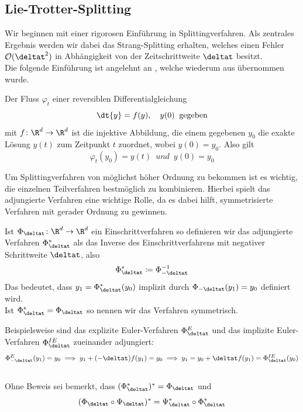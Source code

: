 \subsection{Lie-Trotter-Splitting}
\label{seclietrotter}
Wir beginnen mit einer rigorosen Einführung in Splittingverfahren. Als zentrales Ergebnis werden wir dabei das Strang-Splitting erhalten, welches einen Fehler $\mathcal{O}(\deltat^2)$ in Abhängigkeit von der Zeitschrittweite $\deltat$ besitzt.\\
Die folgende Einführung ist angelehnt an \autocite{patrickdiplom}, welche wiederum aus \autocite[Kapitel II.3 bis II.5]{HairerLubichWanner} übernommen wurde.
\begin{mathdef}
Der Fluss $\varphi_t$ einer reversiblen Differentialgleichung
\begin{equation}
\label{orddgl}
\dt{y}=f(y),\quad y(0)\:\text{ gegeben}
\end{equation}
mit $f\colon \R^d\to\R^d$ ist die injektive Abbildung, die einem gegebenen $y_0$ die exakte Lösung $y(t)$ zum Zeitpunkt $t$ zuordnet, wobei $y(0)=y_0$. Also gilt
\begin{equation*}
\varphi_t(y_0)=y(t)\enspace und\enspace y(0)=y_0
\end{equation*}
\end{mathdef}

Um Splittingverfahren von möglichst höher Ordnung zu bekommen ist es wichtig, die einzelnen Teilverfahren bestmöglich zu kombinieren. Hierbei spielt das adjungierte Verfahren eine wichtige Rolle, da es dabei hilft, symmetrisierte Verfahren mit gerader Ordnung zu gewinnen.
\begin{mathdef}
Ist $\Phi_{\deltat}\colon\R^d\to\R^d$ ein Einschrittverfahren so definieren wir das adjungierte Verfahren $\Phi_{\deltat}^*$ als das Inverse des Einschrittverfahrens mit negativer Schrittweite $\deltat$, also \[\Phi_{\deltat}^*\coloneqq\Phi_{-\deltat}^{-1}\]
Das bedeutet, dass $y_1=\Phi_{\deltat}^*(y_0)$ implizit durch $\Phi_{-\deltat}(y_1)=y_0$ definiert wird.\\
Ist $\Phi_{\deltat}^*=\Phi_{\deltat}$ so nennen wir das Verfahren symmetrisch.
\end{mathdef}
Beispielsweise sind das explizite Euler-Verfahren $\Phi_{\deltat}^E$ und das implizite Euler-Verfahren $\Phi_{\deltat}^{IE}$ zueinander adjungiert: 
\[\Phi_{-\deltat}^E(y_1)=y_0\implies y_1+(-\deltat)f(y_1)=y_0\implies y_1=y_0+\deltat f(y_1)=\Phi_{\deltat}^{IE}(y_0)\] \\
Ohne Beweis sei bemerkt, dass $(\Phi_{\deltat}^*)^*=\Phi_{\deltat}$ und 
\begin{equation}
\label{adjlemma}
(\Phi_{\deltat}\circ \Psi_{\deltat})^*=\Psi_{\deltat}^* \circ \Phi_{\deltat}^*
\end{equation}

